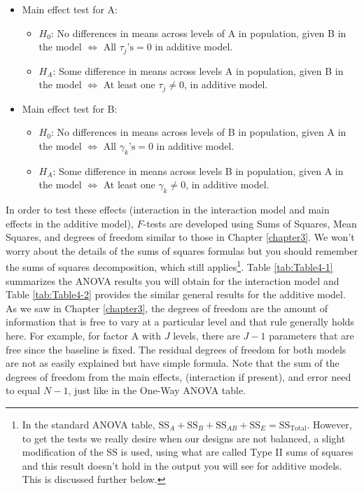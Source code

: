 \documentclass[]{book}
\let\rmarkdownfootnote\footnote%
\def\footnote{\protect\rmarkdownfootnote}
\theoremstyle{definition}
\theoremstyle{definition}
\theoremstyle{remark}
\begin{document}
\begin{itemize}
\item
  Main effect test for A:

  \begin{itemize}
  \item
    \(H_0\): No differences in means across levels of A in population,
    given B in the model \(\Leftrightarrow\) All \(\tau_j\text{'s} = 0\)
    in additive model.
  \item
    \(H_A\): Some difference in means across levels A in population,
    given B in the model \(\Leftrightarrow\) At least one
    \(\tau_j \ne 0\), in additive model.
  \end{itemize}
\item
  Main effect test for B:

  \begin{itemize}
  \item
    \(H_0\): No differences in means across levels of B in population,
    given A in the model \(\Leftrightarrow\) All
    \(\gamma_k\text{'s} = 0\) in additive model.
  \item
    \(H_A\): Some difference in means across levels B in population,
    given A in the model \(\Leftrightarrow\) At least one
    \(\gamma_k \ne 0\), in additive model.
  \end{itemize}
\end{itemize}

In order to test these effects (interaction in the interaction model and
main effects in the additive model), \(F\)-tests are developed using
Sums of Squares, Mean Squares, and degrees of freedom similar to those
in Chapter \ref{chapter3}. We won't worry about the details of the sums
of squares formulas but you should remember the sums of squares
decomposition, which still applies\footnote{In the standard ANOVA table,
  \(\text{SS}_A + \text{SS}_B + \text{SS}_{AB} + \text{SS}_E = \text{SS}_{\text{Total}}\).
  However, to get the tests we really desire when our designs are not
  balanced, a slight modification of the SS is used, using what are
  called Type II sums of squares and this result doesn't hold in the
  output you will see for additive models. This is discussed further
  below.}. Table \ref{tab:Table4-1} summarizes the ANOVA results you
will obtain for the interaction model and Table \ref{tab:Table4-2}
provides the similar general results for the additive model. As we saw
in Chapter \ref{chapter3}, the degrees of freedom are the amount of
information that is free to vary at a particular level and that rule
generally holds here. For example, for factor A with \(J\) levels, there
are \(J-1\) parameters that are free since the baseline is fixed. The
residual degrees of freedom for both models are not as easily explained
but have simple formula. Note that the sum of the degrees of freedom
from the main effects, (interaction if present), and error need to equal
\(N-1\), just like in the One-Way ANOVA table.
\end{document}
